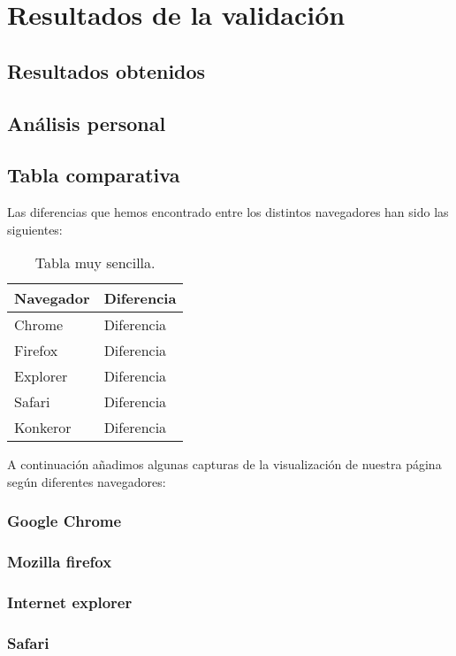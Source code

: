 \section{Resultados de la validación}
\subsection{Resultados obtenidos}
\subsection{Análisis personal}
\subsection{Tabla comparativa}
Las diferencias que hemos encontrado entre los distintos navegadores han sido las siguientes:\\
\begin{table}[htbp]
	\begin{center}
		\begin{tabular}{|l|l|}
			\hline
			Navegador & Diferencia \\
			\hline \hline
			Chrome & Diferencia \\ \hline
			Firefox & Diferencia \\ \hline
			Explorer & Diferencia \\ \hline
			Safari & Diferencia \\ \hline
			Konkeror & Diferencia \\ \hline
		\end{tabular}
		\caption{Tabla muy sencilla.}
		\label{tabla:sencilla}
	\end{center}
\end{table}
A continuación añadimos algunas capturas de la visualización de nuestra página según diferentes navegadores:
\subsubsection{Google Chrome}
\subsubsection{Mozilla firefox}
\subsubsection{Internet explorer}
\subsubsection{Safari}
